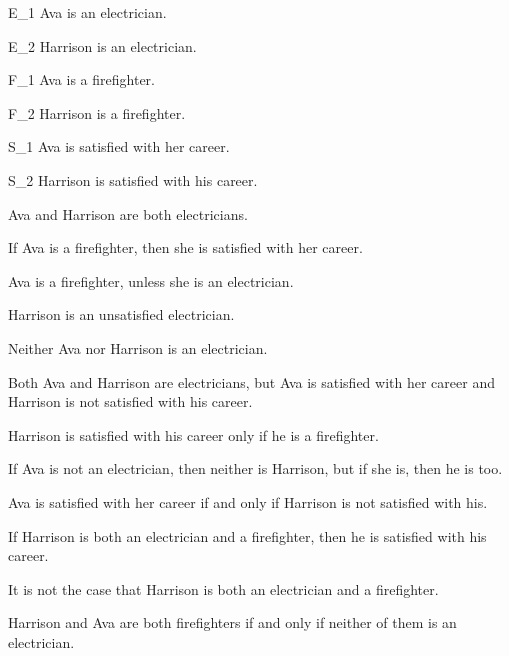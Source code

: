 \problempart\label{pr.avacareer}
	\begin{ekey}
		\item[E_1] Ava is an electrician.
		\item[E_2] Harrison is an electrician.
		\item[F_1] Ava is a firefighter.
		\item[F_2] Harrison is a firefighter.
		\item[S_1] Ava is satisfied with her career.
		\item[S_2] Harrison is satisfied with his career.
	\end{ekey}
\begin{earg}
\item Ava and Harrison are both electricians.
\item[] 
\item If Ava is a firefighter, then she is satisfied with her career.
\item[] 
\item Ava is a firefighter, unless she is an electrician.
\item[] 
\item Harrison is an unsatisfied electrician.
\item[] 
\item Neither Ava nor Harrison is an electrician.
\item[] 
\item Both Ava and Harrison are electricians, but Ava is satisfied with her career and Harrison is not satisfied with his career.
\item[] 
\item Harrison is satisfied with his career only if he is a firefighter.
\item[] 
\item If Ava is not an electrician, then neither is Harrison, but if she is, then he is too.
\item[] 
\item Ava is satisfied with her career if and only if Harrison is not satisfied with his.
\item[] 
\item If Harrison is both an electrician and a firefighter, then he is satisfied with his career.
\item[] 
\item It is not the case that Harrison is both an electrician and a firefighter.
\item[] 
\item Harrison and Ava are both firefighters if and only if neither of them is an electrician.
\item[] 
\end{earg}

